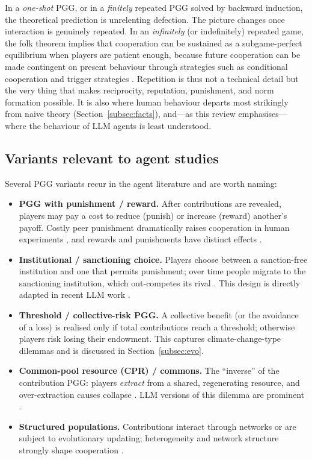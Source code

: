 \documentclass[11pt,a4paper]{article}
\begin{document}
In a \emph{one-shot} PGG, or in a \emph{finitely} repeated PGG solved by backward
induction, the theoretical prediction is unrelenting defection. The picture
changes once interaction is genuinely repeated. In an \emph{infinitely} (or
indefinitely) repeated game, the folk theorem implies that cooperation can be
sustained as a subgame-perfect equilibrium when players are patient enough,
because future cooperation can be made contingent on present behaviour through
strategies such as conditional cooperation and trigger strategies
\citep{camerer2003behavioral}. Repetition is thus not a technical detail but the
very thing that makes reciprocity, reputation, punishment, and norm formation
possible. It is also where human behaviour departs most strikingly from naive
theory (Section~\ref{subsec:facts}), and---as this review emphasises---where the
behaviour of LLM agents is least understood.

\subsection{Variants relevant to agent studies}

Several PGG variants recur in the agent literature and are worth naming:
\begin{itemize}
  \item \textbf{PGG with punishment / reward.} After contributions are revealed,
  players may pay a cost to reduce (punish) or increase (reward) another's payoff.
  Costly peer punishment dramatically raises cooperation in human experiments
  \citep{fehr2000cooperation,fehr2002altruistic}, and rewards and punishments have
  distinct effects \citep{andreoni2003carrot}.
  \item \textbf{Institutional / sanctioning choice.} Players choose between a
  sanction-free institution and one that permits punishment; over time people
  migrate to the sanctioning institution, which out-competes its rival
  \citep{gurerk2006competitive}. This design is directly adapted in recent
  LLM work \citep{guzman2025corrupted}.
  \item \textbf{Threshold / collective-risk PGG.} A collective benefit (or the
  avoidance of a loss) is realised only if total contributions reach a threshold;
  otherwise players risk losing their endowment. This captures climate-change-type
  dilemmas \citep{milinski2008collective,santos2011risk} and is discussed in
  Section~\ref{subsec:evo}.
  \item \textbf{Common-pool resource (CPR) / commons.} The ``inverse'' of the
  contribution PGG: players \emph{extract} from a shared, regenerating resource,
  and over-extraction causes collapse \citep{ostrom1990governing}. LLM versions
  of this dilemma are prominent \citep{piatti2024govsim}.
  \item \textbf{Structured populations.} Contributions interact through networks
  or are subject to evolutionary updating; heterogeneity and network structure
  strongly shape cooperation \citep{santos2008social,szabo2007evolutionary}.
\end{itemize}
\end{document}
